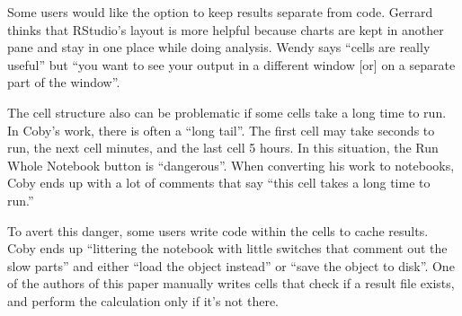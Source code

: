 Some users would like the option to keep results separate from code.
Gerrard thinks that RStudio's layout is more helpful because charts
are kept in another pane and stay in one place while doing analysis. Wendy says
``cells are really useful'' but ``you want to see your output in a different
window [or] on a separate part of the window''.

The cell structure also can be problematic if some cells take a long time to
run. In Coby's work, there is often a ``long tail''.  The first cell may take
seconds to run, the next cell minutes, and the last cell 5 hours.  In this
situation, the Run Whole Notebook button is ``dangerous''. When converting
his work to notebooks, Coby ends up with a lot of comments that say ``this cell
takes a long time to run.''

To avert this danger, some users write code within the cells to
cache results. Coby ends up ``littering the notebook with little switches that
comment out the slow parts'' and either ``load the object instead'' or ``save
the object to disk''. One of the authors of this paper manually writes cells
that check if a result file exists, and perform the calculation only if it's not
there.






